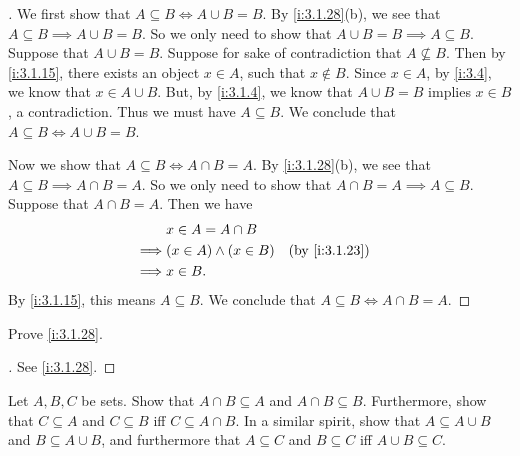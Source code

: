 \begin{proof}[]
  We first show that \(A \subseteq B \iff A \cup B = B\).
  By \cref{i:3.1.28}(b), we see that \(A \subseteq B \implies A \cup B = B\).
  So we only need to show that \(A \cup B = B \implies A \subseteq B\).
  Suppose that \(A \cup B = B\).
  Suppose for sake of contradiction that \(A \not\subseteq B\).
  Then by \cref{i:3.1.15}, there exists an object \(x \in A\), such that \(x \notin B\).
  Since \(x \in A\), by \cref{i:3.4}, we know that \(x \in A \cup B\).
  But, by \cref{i:3.1.4}, we know that \(A \cup B = B\) implies \(x \in B\), a contradiction.
  Thus we must have \(A \subseteq B\).
  We conclude that \(A \subseteq B \iff A \cup B = B\).

  Now we show that \(A \subseteq B \iff A \cap B = A\).
  By \cref{i:3.1.28}(b), we see that \(A \subseteq B \implies A \cap B = A\).
  So we only need to show that \(A \cap B = A \implies A \subseteq B\).
  Suppose that \(A \cap B = A\).
  Then we have
  \begin{align*}
             & x \in A = A \cap B                           \\
    \implies & (x \in A) \land (x \in B) &  & \by{i:3.1.23} \\
    \implies & x \in B.
  \end{align*}
  By \cref{i:3.1.15}, this means \(A \subseteq B\).
  We conclude that \(A \subseteq B \iff A \cap B = A\).
\end{proof}

\begin{ex}\label{i:ex:3.1.6}
  Prove \cref{i:3.1.28}.
\end{ex}

\begin{proof}[]
  See \cref{i:3.1.28}.
\end{proof}

\begin{ex}\label{i:ex:3.1.7}
  Let \(A, B, C\) be sets.
  Show that \(A \cap B \subseteq A\) and \(A \cap B \subseteq B\).
  Furthermore, show that \(C \subseteq A\) and \(C \subseteq B\) iff \(C \subseteq A \cap B\).
  In a similar spirit, show that \(A \subseteq A \cup B\) and \(B \subseteq A \cup B\), and furthermore that \(A \subseteq C\) and \(B \subseteq C\) iff \(A \cup B \subseteq C\).
\end{ex}

